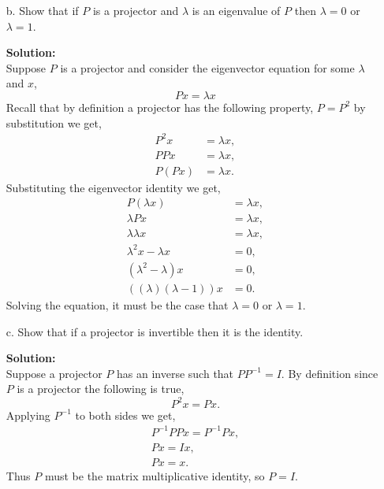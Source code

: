 \documentclass[12pt]{article}
\makeatletter
\theoremstyle{homework}
\newenvironment{exercise}[1]
{\def\@currentlabel{#1}\exercisecore}
{\endexercisecore}
\newcommand{\localhead}[1]{\par\smallskip\noindent\textbf{#1}\nobreak\\}%
\newcommand\solution{\localhead{Solution:}}
\makeatother
\begin{document}
\begin{exercise}{P12}
\begin{enumerate}
    \item[b.] Show that if $P$ is a projector and $\lambda$ is an eigenvalue of $P$ then 
    $\lambda = 0$ or $\lambda = 1$. \\
    \solution Suppose $P$ is a projector and consider the eigenvector equation for some $\lambda$ and $x$,
    \begin{equation*}
      Px = \lambda x
    \end{equation*}
    Recall that by definition a projector has the following property, $P = P^2$ by substitution we get,
    \begin{align*}
      P^2x &= \lambda x,\\
      PPx &= \lambda x,\\
      P(Px) &= \lambda x.
    \end{align*}
    Substituting the eigenvector identity we get, 
      \begin{align*}
      P(\lambda x) &= \lambda x,\\
      \lambda Px &= \lambda x,\\
      \lambda \lambda x &= \lambda x,\\
      \lambda^2x - \lambda x &= 0,\\
      (\lambda^2 - \lambda)x &= 0,\\
      ((\lambda)(\lambda - 1))x &= 0.
    \end{align*}
    Solving the equation, it must be the case that $\lambda = 0$ or $\lambda = 1$.
    \vspace{.15in}
    
    \item[c.] Show that if a projector is invertible then it is the identity.\\
    \solution Suppose a projector $P$ has an inverse such that $PP^{-1} = I$. By definition
    since $P$ is a projector the following is true,
    \begin{equation*}
      P^2x = Px.
    \end{equation*}
    Applying $P^{-1}$ to both sides we get, 
    \begin{align*}
      P^{-1}PPx =  P^{-1}Px,\\
      Px =  Ix,\\
      Px =  x.
    \end{align*}
    Thus $P$ must be the matrix multiplicative identity, so $P = I$.
    \vspace{.15in}
  \end{enumerate}
\end{exercise}
\vspace{1in}
\end{document}
